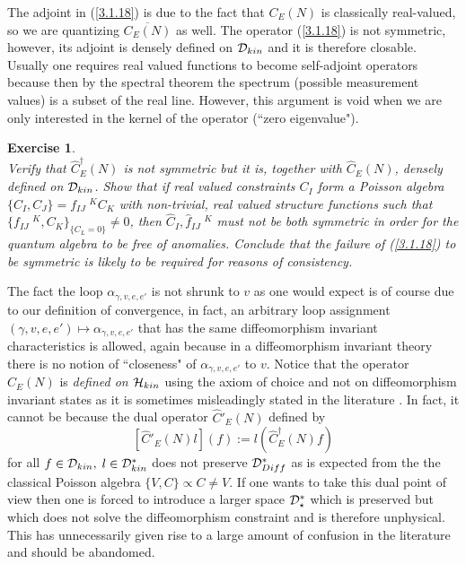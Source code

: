\documentclass[12pt]{report}
\newtheorem{Exercise}{Exercise}[section]
\def\be{\begin{equation}}
\def\ee{\end{equation}}
\begin{document}
%
The adjoint in (\ref{3.1.18}) is due to the fact that $C_E(N)$ is 
classically real-valued, so we are quantizing $\overline{C_E(N)}$ as well.
The operator (\ref{3.1.18}) is not symmetric, however, its adjoint 
is densely defined on ${\cal D}_{kin}$ and it is therefore closable.
Usually one requires real valued functions to become self-adjoint operators
because then by the spectral theorem the spectrum (possible measurement
values) is a subset of the real line. However, this argument is void when 
we are only interested in the kernel of the operator (``zero eigenvalue").
%
\begin{Exercise} \label{ex3.1.6} ~~~\\
Verify that $\hat{C}^\dagger_E(N)$ is not symmetric but it is, together with 
$\hat{C}_E(N)$, densely defined on ${\cal D}_{kin}$. Show that 
if real valued constraints $C_I$ form a Poisson algebra 
$\{C_I,C_J\}=f_{IJ}\;^K C_K$ with non-trivial, real valued structure 
functions such that $\{f_{IJ}\;^K,C_K\}_{\{C_L=0\}}\not=0$, 
then $\hat{C}_I,\hat{f}_{IJ}\;^K$ must not be both symmetric in order for 
the quantum algebra to be free of anomalies. Conclude that the failure 
of (\ref{3.1.18}) to be symmetric is likely to be required for reasons 
of consistency.
\end{Exercise}
%
The fact the loop $\alpha_{\gamma,v,e,e'}$ is not shrunk to $v$ as one 
would expect is of course due to our definition of convergence, in fact,
an arbitrary loop assignment $(\gamma,v,e,e')\mapsto \alpha_{\gamma,v,e,e'}$
that has the same diffeomorphism invariant characteristics is allowed, again
because in a diffeomorphism invariant theory there is no notion of 
``closeness" of $\alpha_{\gamma,v,e,e'}$ to $v$. Notice that the operator 
$\hat{C}_E(N)$ is {\it defined on ${\cal H}_{kin}$} using the axiom of 
choice and not on 
diffeomorphism invariant states as it is sometimes misleadingly stated in 
the literature \cite{43}. In fact, it cannot be because the dual operator 
$\hat{C}'_E(N)$ defined by
\be \label{3.1.20}
[\hat{C}'_E(N) l](f):=l(\hat{C}^\dagger_E(N) f)
\ee
for all $f\in {\cal D}_{kin},\;l\in {\cal D}^\ast_{kin}$ does not 
preserve ${\cal D}_{Diff}^\ast$ as is expected from the the classical
Poisson algebra $\{V,C\}\propto C\not= V$. If one wants to take this dual
point of view then one is forced to introduce a larger space 
${\cal D}^\ast_\star$ which is preserved but which does not solve the 
diffeomorphism constraint and is therefore unphysical. This has unnecessarily
given rise to a large amount of confusion in the literature and should be 
abandomed.
\end{document}
